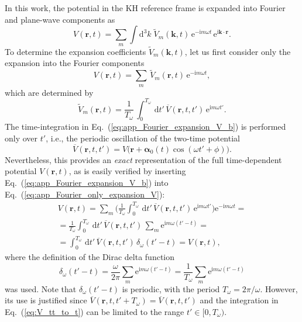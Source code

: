 \documentclass[
pra%
,preprint%
,amssymb, nobibnotes, aps, superscriptaddress, floatfix]{revtex4}
\renewcommand{\imath}{\mathrm{i}}
\newcommand{\dd}{\mathrm{d}}
\newcommand{\rv}{\mathbf{r}}
\newcommand{\av}{\boldsymbol{\alpha}}
\newcommand{\kv}{\mathbf{k}}
\newcommand{\phase}{\phi}
\newcommand{\Vt}{\widetilde{V}}
\newcommand{\Vb}{\overline{V}}
\newcommand{\intK}{\int \dd^3 k}
\newcommand{\Vidx}[1]{\Vt_{#1}}
\newcommand{\Vmk}{\Vidx{m}(\kv, t)} %
\def\e#1{\mathrm{e}^{#1}}
\begin{document}
In this work, the potential in the KH reference frame is expanded into Fourier and plane-wave components as
\begin{equation}
V(\rv, t) = \sum_{m} \intK \; \Vmk \, \mathrm{e}^{-\imath m \omega t} \, 
\e{\imath \kv \cdot \rv}. \label{eq:app_Fourier_expansion_V_a}
\end{equation} 
To determine the expansion coefficients $\Vmk$, let us first consider only the expansion into the Fourier components
\begin{equation}
V(\rv, t) = \sum_{m} \, \Vidx{m}(\rv, t) \, \e{-\imath m \omega t},\label{eq:app_Fourier_only_expansion_V} 
\end{equation}
which are determined by
\begin{equation}
\Vidx{m}(\rv, t) = \frac{1}{T_{\omega}} \, \int_0^{T_\omega} \, \dd t' \, \Vb(\rv, t, t') \, 
\e{\imath m \omega t'}.\label{eq:app_Fourier_expansion_V_b}
\end{equation}
The time-integration in Eq.~(\ref{eq:app_Fourier_expansion_V_b}) is performed only over $t'$, i.e., the periodic oscillation of the two-time potential
\begin{equation}
\Vb(\rv, t, t') = V\big(\rv + \av_0(t)\cos(\omega t'+\phase)\big).\label{eq:app_Fourier_expansion_V_c} 
\end{equation}
Nevertheless, this provides an \emph{exact} representation of the full time-dependent potential $V(\rv, t)$, as is easily verified 
by inserting Eq.~(\ref{eq:app_Fourier_expansion_V_b}) into Eq.~(\ref{eq:app_Fourier_only_expansion_V}):
\begin{multline}
V(\rv, t) =
\sum_m \Big( 
\frac{1}{T_\omega} \int_0^{T_\omega} \, \dd t' \, \Vb(\rv, t, t') \, \e{\imath m \omega t'}
\Big) \e{-\imath m \omega t} = \\
=\frac{1}{T_\omega} \int_0^{T_\omega} \, \dd t' \, \Vb(\rv, t, t') \, \sum_m \e{\imath m \omega (t'-t)} = \\
=\int_0^{T_\omega} \, \dd t' \, \Vb(\rv, t, t') \, \delta_\omega(t'-t) = V(\rv, t), \label{eq:V_tt_to_t}
\end{multline}
where the definition of the Dirac delta function
\begin{equation}
\delta_\omega(t'-t) = \frac{\omega}{2\pi} \sum_m \e{\imath m \omega (t'-t)} = 
\frac{1}{T_\omega} \sum_m \e{\imath m \omega (t'-t)} \label{eq:delta_def}
\end{equation}
was used.
Note that $\delta_\omega(t'-t)$ is periodic, with the period $T_\omega=2\pi/\omega$. However, its use is justified since $\Vb(\rv, t, t'+T_\omega)=\Vb(\rv, t, t')$ and the integration in Eq.~(\ref{eq:V_tt_to_t}) can be limited to the range $t' \in [0, T_\omega)$.
\end{document}
